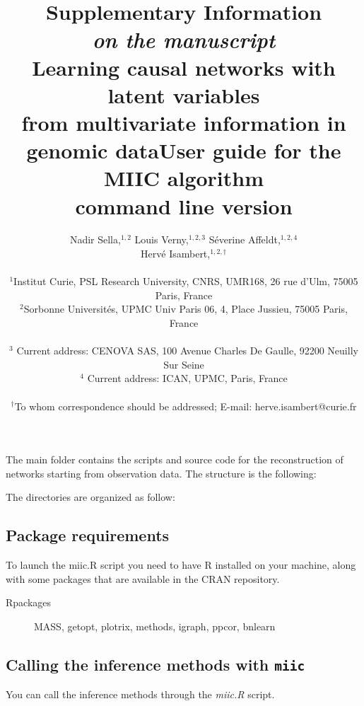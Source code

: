 \documentclass[12pt]{article}
\title{Supplementary Information\\
{\small \em on the manuscript}\\
Learning causal networks with latent variables\\ from multivariate information in genomic data} %
\author
{Nadir Sella,$^{1,2}$ Louis Verny,$^{1,2,3}$ S\'everine Affeldt,$^{1,2,4}$\\  Herv\'e Isambert,$^{1,2,\dag}$\\
\\
\normalsize{$^{1}$Institut Curie, PSL Research University, CNRS, UMR168, 26 rue d’Ulm, 75005 Paris, France}\\
\normalsize{$^{2}$Sorbonne Universit\'es, UPMC Univ Paris 06, 4, Place Jussieu, 75005 Paris, France}\\
\\
\normalsize{$^{3}$ Current address: CENOVA SAS, 100 Avenue Charles De Gaulle, 92200 Neuilly Sur Seine}\\
\normalsize{$^{4}$ Current address: ICAN, UPMC, Paris, France}\\
\\
\normalsize{$^\dag$To whom correspondence should be addressed; E-mail:  herve.isambert@curie.fr}
}
\date{}
\title{User guide for the MIIC algorithm\\command line version}
\begin{document}
\maketitle

The main folder contains the scripts and source code for the reconstruction of networks starting from observation data. The structure is the following:


The directories are organized as follow:
\subsection*{Package requirements}
To launch the miic.R script you need to have R installed on your machine, along with some packages that are available in the CRAN repository. 
\begin{description}
		\item[Rpackages]	MASS, getopt, plotrix, methods, igraph, ppcor, bnlearn   
\end{description}
	
\subsection*{Calling the inference methods with {\tt miic}}

You can call the inference methods through the \textit{miic.R} script.
\end{document}

